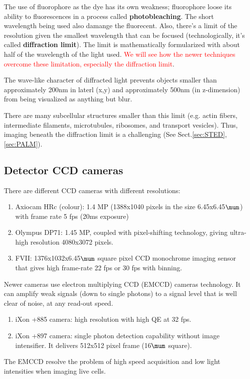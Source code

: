 The use of fluorophore as the dye has its own weakness; fluorophore loose its
ability to fluorescences in a process called {\bf photobleaching}. The short
wavelength being used also damange the fluorecent. Also, there's a limit of the
resolution given the smallest wavelength that can be focused (technologically,
it's called {\bf diffraction limit}). The limit is mathematically formularized
with about half of the wavelength of the light used. \textcolor{red}{We will
see how the newer techniques overcome these limitation, especially the
diffraction limit}.

\begin{framed}
The wave-like character of diffracted light prevents objects smaller than
approximately 200nm in laterl (x,y) and approximately 500nm (in z-dimension)
from being visualized as anything but blur. 

There are many subcellular structures smaller than this limit (e.g.  actin
fibers, intermediate filaments, microtubules, ribosomes, and transport
vesicles). Thus, imaging beneath the diffraction limit is a challenging (See
Sect.\ref{sec:STED}, \ref{sec:PALM}).
\end{framed}

\subsection{Detector CCD cameras}

There are different CCD cameras with different resolutions:
\begin{enumerate}
  \item Axiocam HRc (colour): 1.4 MP (1388x1040 pixels in the size
  6.45x6.45$\mum$) with frame rate 5 fps (20ms exposure)
  
  \item Olympus DP71: 1.45 MP, coupled with pixel-shifting technology, giving
  ultra-high resolution 4080x3072 pixels.
  
  \item FVII: 1376x1032x6.45$\mum$ square pixel CCD monochrome imaging sensor
  that gives high frame-rate 22 fps or 30 fps with binning.
\end{enumerate}

Newer cameras use electron multiplying CCD (EMCCD) cameras technology. It can
amplify weak signals (down to single photons) to a signal level that is well
clear of noise, at any read-out speed. 
\begin{enumerate}
  \item iXon +885 camera: high resolution with high QE at 32 fps.
  \item iXon +897 camera: single photon detection capability without image
  intensifier. It delivers 512x512 pixel frame (16$\mum$ square).
\end{enumerate}
The EMCCD resolve the problem of high speed acquisition and low light
intensities when imaging live cells.


